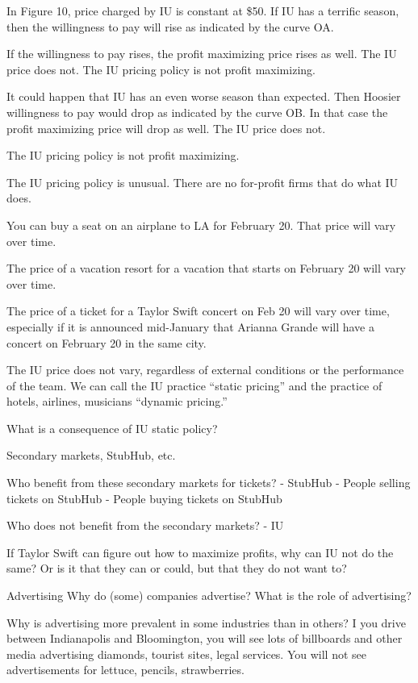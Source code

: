 \documentclass[
]{book}
\begin{document}
In Figure 10, price charged by IU is constant at \$50. If IU has a terrific season, then the willingness to pay will rise as indicated by the curve OA.

If the willingness to pay rises, the profit maximizing price rises as well. The IU price does not. The IU pricing policy is not profit maximizing.

It could happen that IU has an even worse season than expected. Then Hoosier willingness to pay would drop as indicated by the curve OB. In that case the profit maximizing price will drop as well. The IU price does not.

The IU pricing policy is not profit maximizing.

The IU pricing policy is unusual. There are no for-profit firms that do what IU does.

You can buy a seat on an airplane to LA for February 20. That price will vary over time.

The price of a vacation resort for a vacation that starts on February 20 will vary over time.

The price of a ticket for a Taylor Swift concert on Feb 20 will vary over time, especially if it is announced mid-January that Arianna Grande will have a concert on February 20 in the same city.

The IU price does not vary, regardless of external conditions or the performance of the team. We can call the IU practice ``static pricing'' and the practice of hotels, airlines, musicians ``dynamic pricing.''

What is a consequence of IU static policy?

Secondary markets, StubHub, etc.

Who benefit from these secondary markets for tickets?
- StubHub
- People selling tickets on StubHub
- People buying tickets on StubHub

Who does not benefit from the secondary markets?
- IU

If Taylor Swift can figure out how to maximize profits, why can IU not do the same? Or is it that they can or could, but that they do not want to?

Advertising
Why do (some) companies advertise?
What is the role of advertising?

Why is advertising more prevalent in some industries than in others? I you drive between Indianapolis and Bloomington, you will see lots of billboards and other media advertising diamonds, tourist sites, legal services. You will not see advertisements for lettuce, pencils, strawberries.
\end{document}
